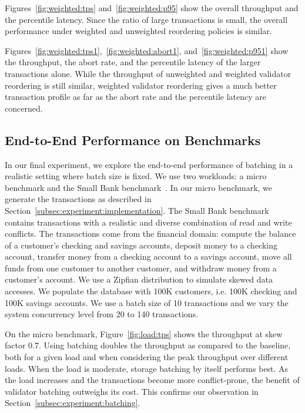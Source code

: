 Figures~\ref{fig:weighted:tps} and~\ref{fig:weighted:p95} show the overall throughput and the percentile latency. Since the ratio of large transactions is small, the overall performance under weighted and unweighted reordering policies is similar.

Figures~\ref{fig:weighted:tps1},~\ref{fig:weighted:abort1}, and~\ref{fig:weighted:p951} show the throughput, the abort rate, and the percentile latency of the larger transactions alone. While the throughput of unweighted and weighted validator reordering is still similar, weighted validator reordering gives a much better transaction profile as far as the abort rate and the percentile latency are concerned.

\subsection{End-to-End Performance on Benchmarks}
\label{subsec:experiment:end2end}
In our final experiment, we explore the end-to-end performance of batching in a realistic setting where batch size is fixed. We use two workloads: a micro benchmark and the Small Bank benchmark~\cite{alomari2008icde}. In our micro benchmark,  we generate the transactions as described in Section~\ref{subsec:experiment:implementation}.  The Small Bank benchmark contains transactions with a realistic and diverse combination of read and write conflicts. The transactions come from the financial domain: compute the balance of a customer's checking and savings accounts, deposit money to a checking account, transfer money from a checking account to a savings account, move all funds from one customer to another customer, and withdraw money from a customer's account. We use a Zipfian distribution to simulate skewed data accesses. We populate the database with 100K customers, i.e. 100K checking and 100K savings accounts. We use a batch size of 10 transactions and we vary the system concurrency level from 20 to 140 transactions. 

On the micro benchmark, Figure~\ref{fig:load:tps} shows the throughput at skew factor 0.7. Using batching doubles the throughput as compared to the baseline, both for a given load and when considering the peak throughput over different loads. When the load is moderate, storage batching by itself performs best. As the load increases and the transactions become more conflict-prone, the benefit of validator batching outweighs its cost. This confirms our observation in Section~\ref{subsec:experiment:batching}. 

